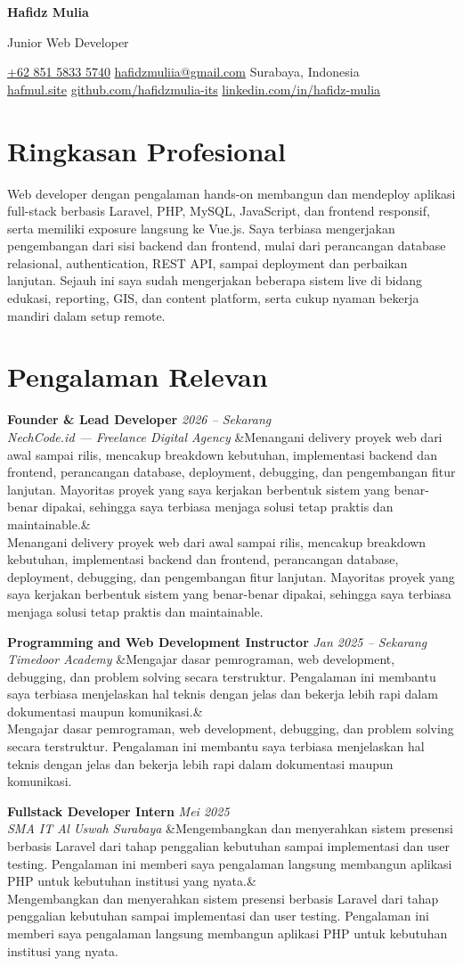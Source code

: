 \documentclass[a4paper,11pt]{article}
\newcommand{\cvname}[1]{%
  {\centering\LARGE\bfseries #1\par\vspace{2pt}}%
}
\newcommand{\cvtitle}[1]{%
  {\centering\large\color{accent} #1\par\vspace{4pt}}%
}
\newcommand{\cvcontact}[1]{%
  {\centering\small #1\par\vspace{6pt}}%
}
\newcommand{\cventry}[4]{%
  \noindent\textbf{#1} \hfill \textit{#3} \\
  \textit{#2}
  \ifx&#4& \else \\ \small #4 \fi
  \vspace{6pt}
}
\begin{document}
\cvname{Hafidz Mulia}
\cvtitle{Junior Web Developer}
\cvcontact{%
  \href{tel:+6285158335740}{+62 851 5833 5740} \quad\textbar\quad
  \href{mailto:hafidzmuliia@gmail.com}{hafidzmuliia@gmail.com} \quad\textbar\quad
  Surabaya, Indonesia \\
  \href{https://hafmul.site}{hafmul.site} \quad\textbar\quad
  \href{https://github.com/hafidzmulia-its}{github.com/hafidzmulia-its} \quad\textbar\quad
  \href{https://www.linkedin.com/in/hafidz-mulia/}{linkedin.com/in/hafidz-mulia}
}

\section{Ringkasan Profesional}
Web developer dengan pengalaman hands-on membangun dan mendeploy aplikasi full-stack berbasis Laravel, PHP, MySQL, JavaScript, dan frontend responsif, serta memiliki exposure langsung ke Vue.js. Saya terbiasa mengerjakan pengembangan dari sisi backend dan frontend, mulai dari perancangan database relasional, authentication, REST API, sampai deployment dan perbaikan lanjutan. Sejauh ini saya sudah mengerjakan beberapa sistem live di bidang edukasi, reporting, GIS, dan content platform, serta cukup nyaman bekerja mandiri dalam setup remote.

\section{Pengalaman Relevan}
\cventry
  {Founder \& Lead Developer}
  {NechCode.id --- Freelance Digital Agency}
  {2026 -- Sekarang}
  {Menangani delivery proyek web dari awal sampai rilis, mencakup breakdown kebutuhan, implementasi backend dan frontend, perancangan database, deployment, debugging, dan pengembangan fitur lanjutan. Mayoritas proyek yang saya kerjakan berbentuk sistem yang benar-benar dipakai, sehingga saya terbiasa menjaga solusi tetap praktis dan maintainable.}

\cventry
  {Programming and Web Development Instructor}
  {Timedoor Academy}
  {Jan 2025 -- Sekarang}
  {Mengajar dasar pemrograman, web development, debugging, dan problem solving secara terstruktur. Pengalaman ini membantu saya terbiasa menjelaskan hal teknis dengan jelas dan bekerja lebih rapi dalam dokumentasi maupun komunikasi.}

\cventry
  {Fullstack Developer Intern}
  {SMA IT Al Uswah Surabaya}
  {Mei 2025}
  {Mengembangkan dan menyerahkan sistem presensi berbasis Laravel dari tahap penggalian kebutuhan sampai implementasi dan user testing. Pengalaman ini memberi saya pengalaman langsung membangun aplikasi PHP untuk kebutuhan institusi yang nyata.}
\end{document}
